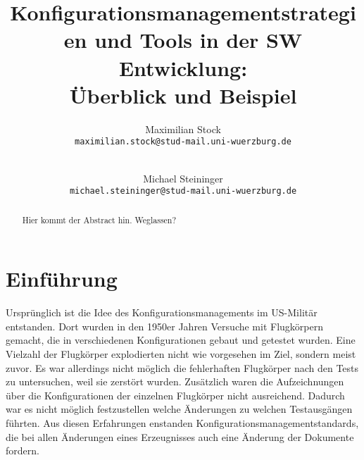 \documentclass[runningheads,a4paper]{uwsese}
\begin{document}
\mainmatter

\title{Konfigurationsmanagementstrategien und Tools in der SW Entwicklung:\\ Überblick und Beispiel}


\author{
  Maximilian Stock\\
  \texttt{maximilian.stock@stud-mail.uni-wuerzburg.de}\\
  \and\\
  Michael Steininger\\
  \texttt{michael.steininger@stud-mail.uni-wuerzburg.de}
}
%



\maketitle


\begin{abstract}
	Hier kommt der Abstract hin. Weglassen?
\end{abstract}


\section{Einführung}
Ursprünglich ist die Idee des Konfigurationsmanagements im US-Militär
entstanden. Dort wurden in den 1950er Jahren Versuche mit Flugkörpern gemacht,
die in verschiedenen Konfigurationen gebaut und getestet wurden. Eine
Vielzahl der Flugkörper explodierten nicht wie vorgesehen im Ziel, sondern
meist zuvor. Es war allerdings nicht möglich die fehlerhaften Flugkörper nach
den Tests zu untersuchen, weil sie zerstört wurden. Zusätzlich waren die
Aufzeichnungen über die Konfigurationen der einzelnen Flugkörper nicht
ausreichend. Dadurch war es nicht möglich festzustellen welche Änderungen zu
welchen Testausgängen führten. Aus diesen Erfahrungen enstanden
Konfigurationsmanagementstandards, die bei allen Änderungen eines Erzeugnisses
auch eine Änderung der Dokumente fordern.
\end{document}
